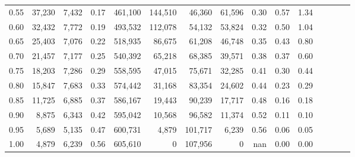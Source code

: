 \begin{tabular}{rrrcrrrrrrrrrrr}
0.55 &  37,230 &  7,432 &                                       0.17 &  461,100 &  144,510 &   46,360 &   61,596 &  0.30 &  0.57 &                         1.34 \\
0.60 &  32,432 &  7,772 &                                       0.19 &  493,532 &  112,078 &   54,132 &   53,824 &  0.32 &  0.50 &                         1.04 \\
0.65 &  25,403 &  7,076 &                                       0.22 &  518,935 &   86,675 &   61,208 &   46,748 &  0.35 &  0.43 &                         0.80 \\
0.70 &  21,457 &  7,177 &                                       0.25 &  540,392 &   65,218 &   68,385 &   39,571 &  0.38 &  0.37 &                         0.60 \\
0.75 &  18,203 &  7,286 &                                       0.29 &  558,595 &   47,015 &   75,671 &   32,285 &  0.41 &  0.30 &                         0.44 \\
0.80 &  15,847 &  7,683 &                                       0.33 &  574,442 &   31,168 &   83,354 &   24,602 &  0.44 &  0.23 &                         0.29 \\
0.85 &  11,725 &  6,885 &                                       0.37 &  586,167 &   19,443 &   90,239 &   17,717 &  0.48 &  0.16 &                         0.18 \\
0.90 &   8,875 &  6,343 &                                       0.42 &  595,042 &   10,568 &   96,582 &   11,374 &  0.52 &  0.11 &                         0.10 \\
0.95 &   5,689 &  5,135 &                                       0.47 &  600,731 &    4,879 &  101,717 &    6,239 &  0.56 &  0.06 &                         0.05 \\
1.00 &   4,879 &  6,239 &                                       0.56 &  605,610 &        0 &  107,956 &        0 &   nan &  0.00 &                         0.00 \\
\bottomrule
\end{tabular}
